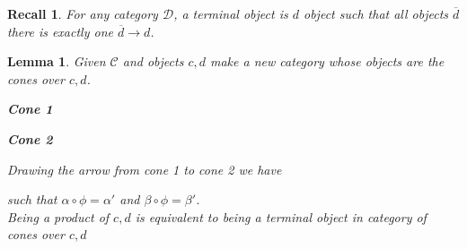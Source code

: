 \documentclass[a4paper,12pt]{article}
\newtheorem{lem}[thm]{Lemma}
\newtheorem{rec}[thm]{Recall}
\begin{document}
\begin{rec}
    For any category $\mathcal{D}$, a terminal object is $d$ object such that all objects $\overline{d}$ there is exactly one $\overline{d}\to d$. 
\end{rec}
\begin{lem}
    Given $\mathcal{C}$ and objects $c,d$ make a new category whose objects are the cones over $c,d$.
    \begin{center}
        \begin{minipage}{0.45\textwidth}
            \centering
            \textbf{Cone 1}
        \end{minipage}
        \hfill
        \begin{minipage}{0.45\textwidth}
            \centering
            \textbf{Cone 2}
        \end{minipage}
    \end{center}
    Drawing the arrow from cone 1 to cone 2 we have 
    \begin{center}
    \end{center}
    such that $\alpha \circ \phi = \alpha'$ and $\beta \circ \phi = \beta'$.\\
    Being a product of $c,d$ is equivalent to being a terminal object in category of cones over $c,d$
\end{lem}
\end{document}
